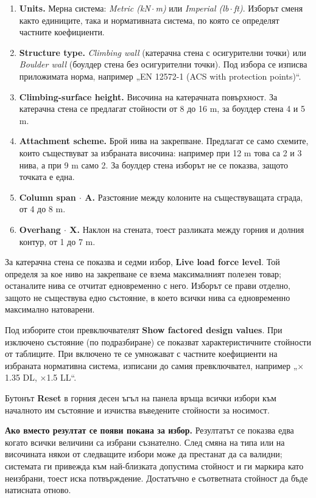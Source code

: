 \begin{enumerate}[topsep=2pt,itemsep=3pt,leftmargin=*]
\item \textbf{Units.} Мерна система: \emph{Metric (kN\,$\cdot$\,m)} или
      \emph{Imperial (lb\,$\cdot$\,ft)}. Изборът сменя както единиците, така и
      нормативната система, по която се определят частните коефициенти.
\item \textbf{Structure type.} \emph{Climbing wall} (катерачна стена с осигурителни
      точки) или \emph{Boulder wall} (боулдер стена без осигурителни точки). Под избора
      се изписва приложимата норма, например „EN 12572-1 (ACS with protection points)“.
\item \textbf{Climbing-surface height.} Височина на катерачната повърхност. За
      катерачна стена се предлагат стойности от 8 до 16 m, за боулдер стена 4 и 5 m.
\item \textbf{Attachment scheme.} Брой нива на закрепване. Предлагат се само схемите,
      които съществуват за избраната височина: например при 12 m това са 2 и 3 нива, а
      при 9 m само 2. За боулдер стена изборът не се показва, защото точката е една.
\item \textbf{Column span $\cdot$ A.} Разстояние между колоните на съществуващата
      сграда, от 4 до 8 m.
\item \textbf{Overhang $\cdot$ X.} Наклон на стената, тоест разликата между горния и
      долния контур, от 1 до 7 m.
\end{enumerate}

За катерачна стена се показва и седми избор, \textbf{Live load force level}. Той
определя за кое ниво на закрепване се взема максималният полезен товар; останалите нива
се отчитат едновременно с него. Изборът се прави отделно, защото не съществува едно
състояние, в което всички нива са едновременно максимално натоварени.

Под изборите стои превключвателят \textbf{Show factored design values}. При изключено
състояние (по подразбиране) се показват характеристичните стойности от таблиците. При
включено те се умножават с частните коефициенти на избраната нормативна система,
изписани до самия превключвател, например „$\times$1.35 DL, $\times$1.5 LL“.

Бутонът \textbf{Reset} в горния десен ъгъл на панела връща всички избори към началното
им състояние и изчиства въведените стойности за носимост.

\textbf{Ако вместо резултат се появи покана за избор.} Резултатът се показва едва
когато всички величини са избрани съзнателно. След смяна на типа или на височината
някои от следващите избори може да престанат да са валидни; системата ги привежда към
най-близката допустима стойност и ги маркира като неизбрани, тоест иска потвърждение.
Достатъчно е съответната стойност да бъде натисната отново.

